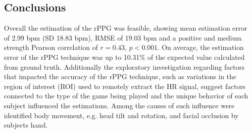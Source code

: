 \subsection{Conclusions}

Overall the estimation of the rPPG was feasible, showing mean estimation error of 2.99 bpm (SD 18.83 bpm), RMSE of 19.03 bpm and a positive and medium strength Pearson correlation of $r=0.43$, $p < 0.001$. On average, the estimation error of the rPPG technique was up to 10.31\% of the expected value calculated from ground truth. Additionally the exploratory investigation regarding factors that impacted the accuracy of the rPPG technique, such as variations in the region of interest (ROI) used to remotely extract the HR signal, suggest factors connected to the type of the game being played and the unique behavior of each subject influenced the estimations. Among the causes of such influence were identified body movement, e.g. head tilt and rotation, and facial occlusion by subjects hand.

